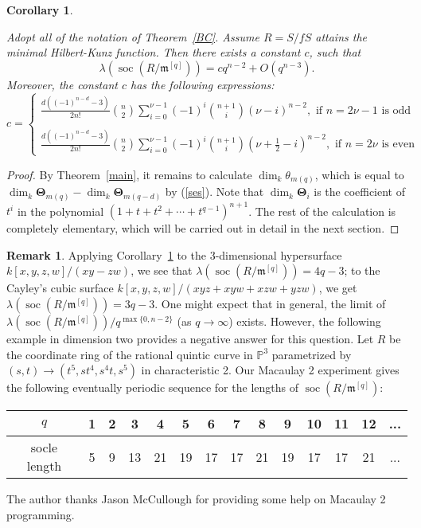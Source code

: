 \documentclass[draft]{amsart}
\newtheorem{cor}[theorem]{Corollary}
\theoremstyle{definition}
\newtheorem{remark}[theorem]{Remark}
\numberwithin{equation}{theorem}
\begin{document}
\begin{cor}
\label{formula}

Adopt all of the notation of Theorem~\ref{BC}. Assume $R=S/fS$ attains the minimal Hilbert-Kunz function. Then there exists a constant $c$, such that
\[\lambda ({\operatorname{soc}}(R/{\mathfrak{m}}^{[q]})) = cq^{n-2}+O(q^{n-3}).\]
Moreover, the constant $c$ has the following expressions:
\begin{displaymath}
   c = \left\{
     \begin{array}{lr}
       \frac{d((-1)^{n-d}-3)}{2n!}{n \choose 2}  \sum_{i=0}^{\nu-1} (-1)^i {{n+1} \choose i} (\nu-i)^{n-2}, \text{ if } n=2\nu-1 \text{ is odd}\\
       \\
      \frac{d((-1)^{n-d}-3)}{2n!}{n \choose 2}   \sum_{i=0}^{\nu-1} (-1)^i {{n+1} \choose i} (\nu+\frac{1}{2}-i)^{n-2} , \text{ if } n=2\nu \text{ is even}
     \end{array}
   \right.
\end{displaymath} 
\end{cor}

\begin{proof} By Theorem~\ref{main}, it remains to calculate
$\dim_k \theta_{m(q)}$, which is equal to $ \dim_k {\boldsymbol{\Theta}}_{m(q)}-
\dim_k {\boldsymbol{\Theta}}_{m(q-d)}$ by (\ref{ses}). Note that $ \dim_k {\boldsymbol{\Theta}}_i$ is the coefficient of $t^i$ in the polynomial $(1+t+t^2+\cdots+t^{q-1})^{n+1}$. The rest of the calculation is completely elementary, which will be carried out in detail in the next section.
\end{proof}

\begin{remark}
Applying Corollary~\ref{formula} to the 3-dimensional hypersurface $k[x,y,z,w]/(xy-zw)$, we see that  $\lambda ({\operatorname{soc}}(R/{\mathfrak{m}}^{[q]}))=4q-3$;  to the Cayley's cubic surface $k[x,y,z,w]/(xyz+xyw+xzw+yzw)$, we get $\lambda ({\operatorname{soc}}(R/{\mathfrak{m}}^{[q]}))=3q-3$. One might expect that in general, the limit of $\lambda ({\operatorname{soc}}(R/{\mathfrak{m}}^{[q]}))/q^{\max\{0, n-2\}}$ (as $q \to {{\infty}}$) exists. However, the following example in dimension two provides a negative answer for this question. Let $R$ be the coordinate ring of the rational quintic curve in $\mathbb P^3$ parametrized by $(s,t) \to (t^5, st^4, s^4t,s^5)$ in characteristic 2. Our Macaulay 2 experiment gives the following eventually periodic sequence for the lengths of ${\operatorname{soc}}(R/{\mathfrak{m}}^{[q]})$:
\begin{center}
\begin{tabular}{|c|c|c|c|c|c|c|c|c|c|c|c|c|c|}
\hline
$q$&1&2&3&4&5&6&7&8&9&10&11&12&...\\
\hline
socle length&5&9&13&21&19&17&17&21&19&17&17&21&...\\
\hline
\end{tabular}
\end{center}
The author thanks Jason McCullough for providing some help on Macaulay 2 programming.
\end{remark}
\end{document}

